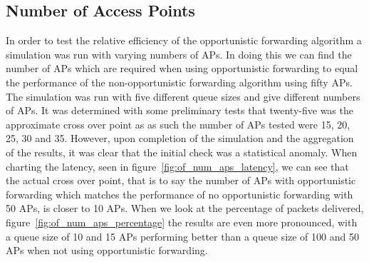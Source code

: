     \subsection{Number of Access Points}\label{data_gathering_performance_number_of_access_points}

        In order to test the relative efficiency of the opportunistic forwarding algorithm a simulation was run with varying numbers of APs. In doing this we can find the number of APs which are required when using opportunistic forwarding to equal the performance of the non-opportunistic forwarding algorithm using fifty APs. The simulation was run with five different queue sizes and give different numbers of APs. It was determined with some preliminary tests that twenty-five was the approximate cross over point as as such the number of APs tested were 15, 20, 25, 30 and 35. However, upon completion of the simulation and the aggregation of the results, it was clear that the initial check was a statistical anomaly. When charting the latency, seen in figure~\ref{fig:of_num_aps_latency}, we can see that the actual cross over point, that is to say the number of APs with opportunistic forwarding which matches the performance of no opportunistic forwarding with 50 APs, is closer to 10 APs. When we look at the percentage of packets delivered, figure~\ref{fig:of_num_aps_percentage} the results are even more pronounced, with a queue size of 10 and 15 APs performing better than a queue size of 100 and 50 APs when not using opportunistic forwarding.

